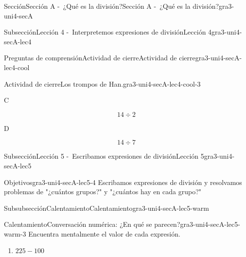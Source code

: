 \documentclass[twoside,10pt,]{article}
\begin{document}
\begin{sectionptx}{Sección}{Sección A -~¿Qué es la división?}{}{Sección A -~¿Qué es la división?}{}{}{gra3-uni4-secA}
\begin{subsectionptx}{Subsección}{Lección 4 -~Interpretemos expresiones de división}{}{Lección 4}{}{}{gra3-uni4-secA-lec4}
\begin{reading-questions-subsubsection}{Preguntas de comprensión}{Actividad de cierre}{}{Actividad de cierre}{}{}{gra3-uni4-secA-lec4-cool}
\begin{project}{Actividad de cierre}{Los trompos de Han.}{gra3-uni4-secA-lec4-cool-3}
\begin{sidebyside}{4}{0.0075}{0.0075}{0.015}
\begin{sbspanel}{0.45}
\end{sbspanel}%
\end{sidebyside}%
\begin{sidebyside}{4}{0.0075}{0.0075}{0.015}%
\begin{sbspanel}{0.02}%
C%
\end{sbspanel}%
\begin{sbspanel}{0.45}%
\par
%
\begin{equation*}
14\div 2
\end{equation*}
%
\end{sbspanel}%
\begin{sbspanel}{0.02}%
\par
D%
\end{sbspanel}%
\begin{sbspanel}{0.45}%
\par
%
\begin{equation*}
14\div 7
\end{equation*}
%
\end{sbspanel}%
\end{sidebyside}%
\end{project}%
\end{reading-questions-subsubsection}
\end{subsectionptx}
%
%
\typeout{************************************************}
\typeout{************************************************}
%
\begin{subsectionptx}{Subsección}{Lección 5 -~Escribamos expresiones de división}{}{Lección 5}{}{}{gra3-uni4-secA-lec5}
\begin{objectives}{Objetivos}{gra3-uni4-secA-lec5-4}
Escribamos expresiones de división y resolvamos problemas de "¿cuántos grupos?" y "¿cuántos hay en cada grupo?"%
\end{objectives}
%
%
\typeout{************************************************}
\typeout{************************************************}
%
\begin{subsubsectionptx}{Subsubsección}{Calentamiento}{}{Calentamiento}{}{}{gra3-uni4-secA-lec5-warm}
\begin{exploration}{Calentamiento}{Conversación numérica: ¿En qué se parecen?}{gra3-uni4-secA-lec5-warm-3}%
Encuentra mentalmente el valor de cada expresión.%
\par
%
\begin{enumerate}
\item{}\(\displaystyle 225 - 100\)%

\end{enumerate}
\end{exploration}
\end{subsubsectionptx}
\end{subsectionptx}
\end{sectionptx}
\end{document}
